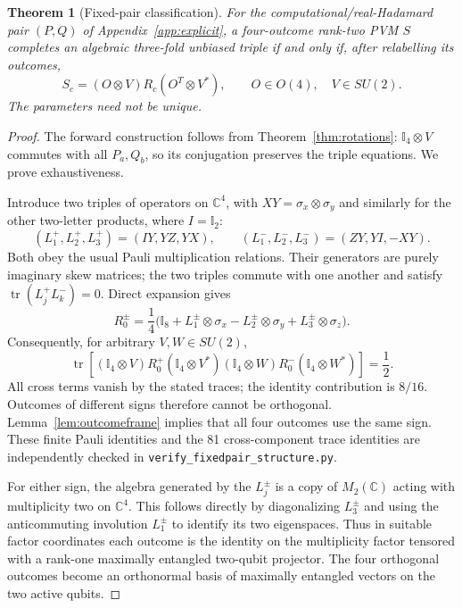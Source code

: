 \documentclass[11pt]{article}
\newtheorem{theorem}{Theorem}[section]
\newcommand{\id}{\mathbb I}
\begin{document}
\begin{theorem}[Fixed-pair classification]\label{thm:fixedpair}
For the computational/real-Hadamard pair $(P,Q)$ of Appendix~\ref{app:explicit}, a
four-outcome rank-two PVM $S$ completes an algebraic three-fold unbiased
triple if and only if, after relabelling its outcomes,
\[
 S_c=(O\otimes V)R_c(O^T\otimes V^*),
 \qquad O\in O(4),\quad V\in SU(2).
\]
The parameters need not be unique.
\end{theorem}
\begin{proof}
The forward construction follows from Theorem~\ref{thm:rotations}:
$\id_4\otimes V$ commutes with all $P_a,Q_b$, so its conjugation
preserves the triple equations. We prove exhaustiveness.

Introduce two triples of operators on $\mathbb C^4$, with $XY=\sigma_x\otimes\sigma_y$ and similarly for the other
two-letter products, where $I=\id_2$:
\[
 (L_1^+,L_2^+,L_3^+)=(IY,YZ,YX),\qquad
 (L_1^-,L_2^-,L_3^-)=(ZY,YI,-XY).
\]
Both obey the usual Pauli multiplication relations. Their generators
are purely imaginary skew matrices; the two triples commute with one
another and satisfy $\operatorname{tr}(L_j^+L_k^-)=0$. Direct expansion
gives
\[
 R_0^{\pm}=\frac14\bigl(\id_8+
 L_1^{\pm}\otimes\sigma_x-L_2^{\pm}\otimes\sigma_y+
 L_3^{\pm}\otimes\sigma_z\bigr).
\]
Consequently, for arbitrary $V,W\in SU(2)$,
\[
 \operatorname{tr}\left[
 (\id_4\otimes V)R_0^+(\id_4\otimes V^*)
 (\id_4\otimes W)R_0^-(\id_4\otimes W^*)\right]=\frac12.
\]
All cross terms vanish by the stated traces; the identity contribution
is $8/16$. Outcomes of different signs therefore cannot be orthogonal.
Lemma~\ref{lem:outcomeframe} implies that all four outcomes use the
same sign. These finite Pauli identities and the 81 cross-component
trace identities are independently checked in
\texttt{verify\_fixedpair\_structure.py}.

For either sign, the algebra generated by the $L_j^{\pm}$ is a copy
of $M_2(\mathbb C)$ acting with multiplicity two on $\mathbb C^4$.
This follows directly by diagonalizing $L_3^{\pm}$ and using the
anticommuting involution $L_1^{\pm}$ to identify its two eigenspaces.
Thus in suitable factor coordinates each outcome is the identity on
the multiplicity factor tensored with a rank-one maximally entangled
two-qubit projector. The four orthogonal outcomes become an orthonormal
basis of maximally entangled vectors on the two active qubits.


\end{proof}
\end{document}
